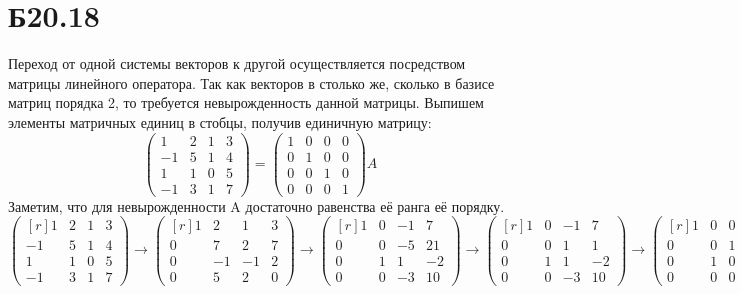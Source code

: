 \documentclass[a4paper,12pt]{article} %
\begin{document}
\section*{Б20.18}
Переход от одной системы векторов к другой осуществляется посредством матрицы линейного оператора. Так как векторов в столько же, сколько в базисе матриц порядка 2, то требуется невырожденность данной матрицы.
Выпишем элементы матричных единиц в стобцы, получив единичную матрицу:
$$\begin{pmatrix*}
    1&2&1&3\\
    -1&5&1&4\\
    1&1&0&5\\
    -1&3&1&7
\end{pmatrix*}=
\begin{pmatrix*}
    1&0&0&0\\
    0&1&0&0\\
    0&0&1&0\\
    0&0&0&1
\end{pmatrix*}A$$
Заметим, что для невырожденности A достаточно равенства её ранга её порядку.
$$\begin{pmatrix*}[r]
    1&2&1&3\\
    -1&5&1&4\\
    1&1&0&5\\
    -1&3&1&7
\end{pmatrix*}\rightarrow
\begin{pmatrix*}[r]
    1&2&1&3\\
    0&7&2&7\\
    0&-1&-1&2\\
    0&5&2&0
\end{pmatrix*}\rightarrow
\begin{pmatrix*}[r]
    1&0&-1&7\\
    0&0&-5&21\\
    0&1&1&-2\\
    0&0&-3&10
\end{pmatrix*}
\rightarrow
\begin{pmatrix*}[r]
    1&0&-1&7\\
    0&0&1&1\\
    0&1&1&-2\\
    0&0&-3&10
\end{pmatrix*}
\rightarrow
\begin{pmatrix*}[r]
    1&0&0&8\\
    0&0&1&1\\
    0&1&0&-3\\
    0&0&0&13
\end{pmatrix*}$$
\end{document}
